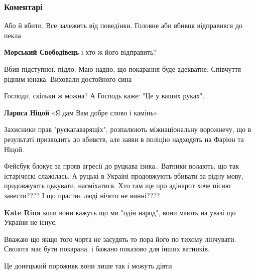  
 
 
 
 
\subsubsection{Коментарі}
\label{sec:07_11_2021.fb.nosenko_ivan.1.balabatjko.cmt}

\begin{itemize} %
Або й вбити. Все залежить від поведінки. Головне аби вбивця відправився до пекла

\begin{itemize} %
\textbf{Морський Свободівець} і хто ж його відправить?
\end{itemize} %

Вбив підступної, підло. Маю надію, що покарання буде адекватне. Співчуття рідним юнака. Виховали достойного сина


Господи, скільки ж можна? А Господь каже: "Це у ваших руках".

\begin{itemize} %
\textbf{Лариса Ніцой} «Я дам Вам добре слово і камінь»

Захисники прав "рускагаварящіх", розпалюють міжнаціональну ворожнечу, що в результаті призводить до вбивств, але заяви в поліцію надходять на Фаріон та Ніцой.
\end{itemize} %


Фейсбук блокує за прояв агресії до руцкава ізика.. Ватники волають, що так
істарічєскі слажілась. А руцькі в Україні продовжують вбивати за рідну мову,
продовжують цькувати, насміхатися. Хто там ще про адінарот хоче пісню
завести???? І що прастиє люді нічєго не винні????

\begin{itemize} %
\textbf{Kate Rina} коли вони кажуть що ми "одін народ", вони мають на увазі що України не існує.
\end{itemize} %


Вважаю що якщо того чорта не засудять то пора його по тихому лінчувати. Сволота
має бути покарана, і бажано показово для інших ватників.

Це донецький порожняк вони лише так і можуть діяти

\end{itemize} %

